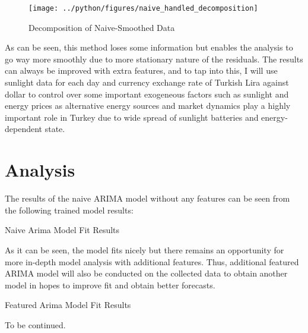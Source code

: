 \documentclass[11pt, a4paper, leqno]{article}
\begin{document}
\begin{figure}[H]

    \centering
    \texttt{[image: ../python/figures/naive\_handled\_decomposition]}

    \caption{Decomposition of Naive-Smoothed Data}
    \label{fig:daily_consumption}

\end{figure}

As can be seen, this method loses some information but enables the analysis to go way more smoothly due to more stationary nature of the residuals.
The results can always be improved with extra features, and to tap into this, I will use sunlight data for each day and currency exchange rate of Turkish Lira against dollar to control over some important exogeneous factors such as sunlight and energy prices as alternative energy sources and market dynamics play a highly important role in Turkey due to wide spread of sunlight batteries and energy-dependent state.



\section{Analysis}
\label{sec:Anlys}

The results of the naive ARIMA model without any features can be seen from the following trained model results:

\begin{table}[!h]
    
    \caption{\label{tab:python-summary} Naive Arima Model Fit Results}
\end{table}


As it can be seen, the model fits nicely but there remains an opportunity for more in-depth model analysis with additional features. Thus, additional featured ARIMA model will also be conducted on the collected data to obtain another model in hopes to improve fit and obtain better forecasts.


\begin{table}[!h]
    
    \caption{\label{tab:python-summary} Featured Arima Model Fit Results}
\end{table}

To be continued.

\printbibliography
{}



\end{document}
